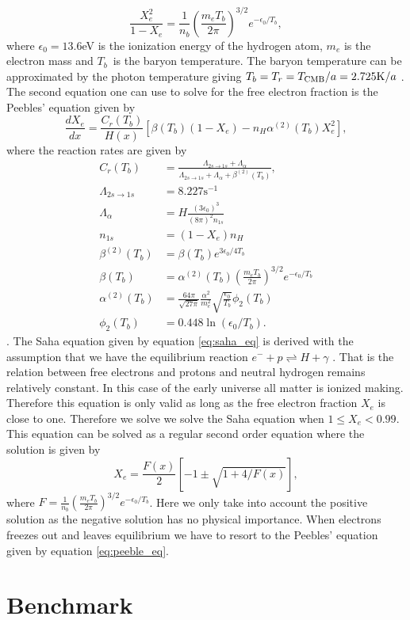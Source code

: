 \documentclass[onecolumn]{aastex62}
\begin{document}
\begin{equation}\label{eq:saha_eq}
    \frac{X_e^2}{1-X_e} = \frac{1}{n_b} \left(\frac{m_eT_b}{2\pi}\right)^{3/2} e^{-\epsilon_0/T_b},
\end{equation}
where $\epsilon_0=13.6$eV is the ionization energy of the hydrogen atom, $m_e$ is the electron mass and $T_b$ is the baryon temperature. The baryon temperature can be approximated by the photon temperature giving $T_b =
T_r = T_{\rm CMB} / a = 2.725 \textrm{K} / a$ \cite{WintherII:2020}. The second equation one can use to solve for the free electron fraction is the Peebles' equation given by
\begin{equation}\label{eq:peeble_eq}
    \frac{dX_e}{dx} = \frac{C_r(T_b)}{H(x)} \left[\beta(T_b)(1-X_e) - n_H\alpha^{(2)}(T_b)X_e^2\right],
\end{equation}
where the reaction rates are given by
\begin{align}
    C_r(T_b) &= \frac{\Lambda_{2s\rightarrow1s} +
    \Lambda_{\alpha}}{\Lambda_{2s\rightarrow1s} + \Lambda_{\alpha} +
    \beta^{(2)}(T_b)}, \\
    \Lambda_{2s\rightarrow1s} &= 8.227 \textrm{s}^{-1}\\
    \Lambda_{\alpha} &= H\frac{(3\epsilon_0)^3}{(8\pi)^2 n_{1s}}\\
    n_{1s} &= (1-X_e)n_H \\
    \beta^{(2)}(T_b) &= \beta(T_b) e^{3\epsilon_0/4T_b} \\
    \beta(T_b) &= \alpha^{(2)}(T_b) \left(\frac{m_e
    T_b}{2\pi}\right)^{3/2} e^{-\epsilon_0/T_b} \\
    \alpha^{(2)}(T_b) &= \frac{64\pi}{\sqrt{27\pi}}
    \frac{\alpha^2}{m_e^2}\sqrt{\frac{\epsilon_0}{T_b}}\phi_2(T_b) \\
    \phi_2(T_b) &= 0.448\ln(\epsilon_0/T_b).
\end{align}
\cite{WintherII:2020}. The Saha equation given by equation \ref{eq:saha_eq} is derived with the assumption that we have the equilibrium reaction $e^- +p\rightleftharpoons H+\gamma$ \cite[p.70]{Dodelson:1282338}. That is the relation between free electrons and protons and neutral hydrogen remains relatively constant. In this case of the early universe all matter is ionized making. Therefore this equation is only valid as long as the free electron fraction $X_e$ is close to one. Therefore we solve we solve the Saha equation when $1\leq X_e<0.99$. This equation can be solved as a regular second order equation where the solution is given by
\begin{equation}
    X_e = \frac{F(x)}{2}\left[-1\pm\sqrt{1+4/F(x)}\right],
\end{equation}
where $F=\frac{1}{n_b} \left(\frac{m_eT_b}{2\pi}\right)^{3/2} e^{-\epsilon_0/T_b}$. Here we only take into account the positive solution as the negative solution has no physical importance. When electrons freezes out and leaves equilibrium we have to resort to the Peebles' equation given by equation \ref{eq:peeble_eq}.
\label{sec:results}

\section{Benchmark}




\end{document}
